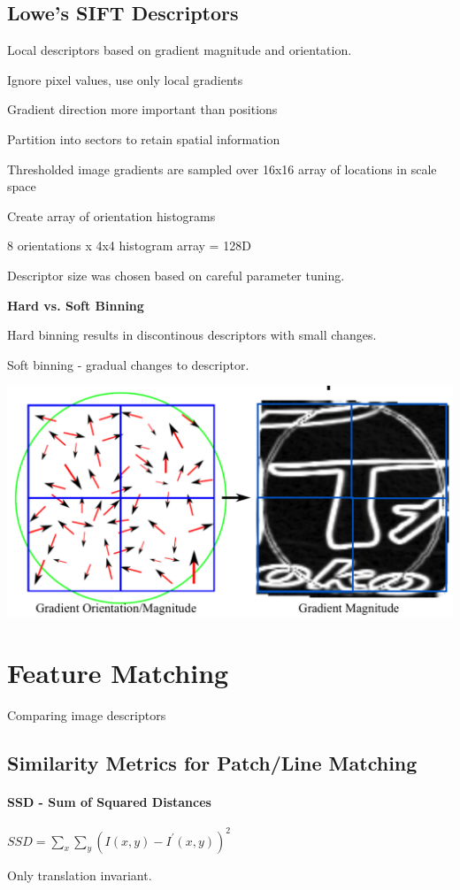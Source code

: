 \subsection{Lowe's SIFT Descriptors}

Local descriptors based on gradient magnitude and orientation.

Ignore pixel values, use only local gradients

Gradient direction more important than positions

Partition into sectors to retain spatial information

Thresholded image gradients are sampled over 16x16 array of locations in scale space

Create array of orientation histograms

8 orientations x 4x4 histogram array = 128D

Descriptor size was chosen based on careful parameter tuning. 


\textbf{Hard vs. Soft Binning}

Hard binning results in discontinous descriptors with small changes.

Soft binning - gradual changes to descriptor.

\includegraphics[width=0.4\columnwidth]{cv_figures/lowe.png}

\section{Feature Matching}

Comparing image descriptors

\subsection{ Similarity Metrics for Patch/Line Matching}

\paragraph*{ SSD - Sum of Squared Distances}

$SSD = \sum_x \sum_y (I(x,y) - I^\prime(x,y))^2$

Only translation invariant.

